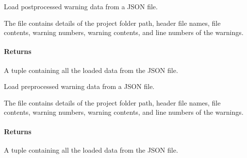 \documentclass[letterpaper,10pt,english]{sphinxmanual}
\begin{document}
\begin{fulllineitems}
\label{\detokenize{main.transport_data:main.transport_data.transport_data.load_post_fix_data_from_json}}
\pysigstartsignatures
{}
\pysigstopsignatures
\sphinxAtStartPar
Load postprocessed warning data from a JSON file.

\sphinxAtStartPar
The file contains details of the project folder path, header file names, file contents,
warning numbers, warning contents, and line numbers of the warnings.


\paragraph{Returns}
\label{\detokenize{main.transport_data:id2}}\begin{description}
\sphinxAtStartPar
A tuple containing all the loaded data from the JSON file.

\end{description}

\end{fulllineitems}


\begin{fulllineitems}
\label{\detokenize{main.transport_data:main.transport_data.transport_data.load_pre_fix_data_from_json}}
\pysigstartsignatures
{}
\pysigstopsignatures
\sphinxAtStartPar
Load preprocessed warning data from a JSON file.

\sphinxAtStartPar
The file contains details of the project folder path, header file names, file contents,
warning numbers, warning contents, and line numbers of the warnings.


\paragraph{Returns}
\label{\detokenize{main.transport_data:id3}}\begin{description}
\sphinxAtStartPar
A tuple containing all the loaded data from the JSON file.

\end{description}

\end{fulllineitems}
\end{document}
